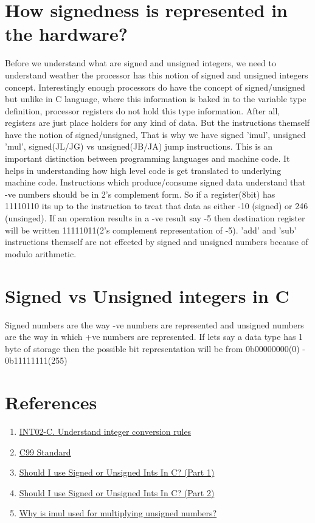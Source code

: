 \documentclass{article}
\begin{document}
\section{How signedness is represented in the hardware?}
Before we understand what are signed and unsigned integers, we need to
understand weather the processor has this notion of signed and unsigned
integers concept. Interestingly enough processors do have the concept of
signed/unsigned but unlike in C language, where this information is baked in to
the variable type definition, processor registers do not hold this type
information. After all, registers are just place holders for any kind of
data. But the instructions themself have the notion of signed/unsigned, That
is why we have signed 'imul', unsigned 'mul', signed(JL/JG) vs unsigned(JB/JA)
jump instructions. This is an important distinction between programming
languages and machine code. It helps in understanding how high level code is get
translated to underlying machine code. Instructions which produce/consume signed
data understand that -ve numbers should be in 2's complement form. So if a
register(8bit) has 11110110 its up to the instruction to treat that data as
either -10 (signed) or 246 (unsinged). If an operation results in a -ve result
say -5 then destination register will be written 11111011(2's complement
representation of -5). 'add' and 'sub' instructions themself are not effected
by signed and unsigned numbers because of modulo arithmetic.

\section{Signed vs Unsigned integers in C}
Signed numbers are the way -ve numbers are represented and unsigned numbers are
the way in which +ve numbers are represented. If lets say a data type has 1
byte of storage then the possible bit representation will be from  0b00000000(0)
- 0b11111111(255)




\section{References}
\begin{enumerate}[noitemsep]
\item \href{https://wiki.sei.cmu.edu/confluence/display/c/INT02-C.+Understand+integer+conversion+rules}{INT02-C. Understand integer conversion rules}
\item \href{http://www.open-std.org/jtc1/sc22/wg14/www/docs/n1256.pdf}{C99 Standard}
\item \href{http://blog.robertelder.org/signed-or-unsigned/}{Should I use Signed or Unsigned Ints In C? (Part 1)}
\item \href{http://blog.robertelder.org/signed-or-unsigned-part-2/}{Should I use Signed or Unsigned Ints In C? (Part 2)}
\item \href{https://stackoverflow.com/a/42589535/2407966}{Why is imul used for multiplying unsigned numbers?}

\end{enumerate}
\end{document}
